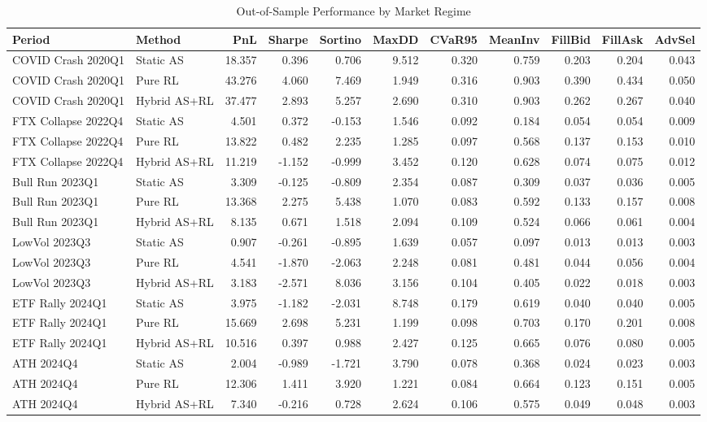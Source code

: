 \begin{table}[htbp]
\centering
\caption{Out-of-Sample Performance by Market Regime}
\label{tab:by_period}
\small
\begin{adjustbox}{max width=\textwidth}
\begin{tabular}{llrrrrrrrrr}
\toprule
Period & Method & PnL & Sharpe & Sortino & MaxDD & CVaR95 & MeanInv & FillBid & FillAsk & AdvSel \\
\midrule
COVID Crash 2020Q1 & Static AS & 18.357 & 0.396 & 0.706 & 9.512 & 0.320 & 0.759 & 0.203 & 0.204 & 0.043 \\
COVID Crash 2020Q1 & Pure RL & 43.276 & 4.060 & 7.469 & 1.949 & 0.316 & 0.903 & 0.390 & 0.434 & 0.050 \\
COVID Crash 2020Q1 & Hybrid AS+RL & 37.477 & 2.893 & 5.257 & 2.690 & 0.310 & 0.903 & 0.262 & 0.267 & 0.040 \\
FTX Collapse 2022Q4 & Static AS & 4.501 & 0.372 & -0.153 & 1.546 & 0.092 & 0.184 & 0.054 & 0.054 & 0.009 \\
FTX Collapse 2022Q4 & Pure RL & 13.822 & 0.482 & 2.235 & 1.285 & 0.097 & 0.568 & 0.137 & 0.153 & 0.010 \\
FTX Collapse 2022Q4 & Hybrid AS+RL & 11.219 & -1.152 & -0.999 & 3.452 & 0.120 & 0.628 & 0.074 & 0.075 & 0.012 \\
Bull Run 2023Q1 & Static AS & 3.309 & -0.125 & -0.809 & 2.354 & 0.087 & 0.309 & 0.037 & 0.036 & 0.005 \\
Bull Run 2023Q1 & Pure RL & 13.368 & 2.275 & 5.438 & 1.070 & 0.083 & 0.592 & 0.133 & 0.157 & 0.008 \\
Bull Run 2023Q1 & Hybrid AS+RL & 8.135 & 0.671 & 1.518 & 2.094 & 0.109 & 0.524 & 0.066 & 0.061 & 0.004 \\
LowVol 2023Q3 & Static AS & 0.907 & -0.261 & -0.895 & 1.639 & 0.057 & 0.097 & 0.013 & 0.013 & 0.003 \\
LowVol 2023Q3 & Pure RL & 4.541 & -1.870 & -2.063 & 2.248 & 0.081 & 0.481 & 0.044 & 0.056 & 0.004 \\
LowVol 2023Q3 & Hybrid AS+RL & 3.183 & -2.571 & 8.036 & 3.156 & 0.104 & 0.405 & 0.022 & 0.018 & 0.003 \\
ETF Rally 2024Q1 & Static AS & 3.975 & -1.182 & -2.031 & 8.748 & 0.179 & 0.619 & 0.040 & 0.040 & 0.005 \\
ETF Rally 2024Q1 & Pure RL & 15.669 & 2.698 & 5.231 & 1.199 & 0.098 & 0.703 & 0.170 & 0.201 & 0.008 \\
ETF Rally 2024Q1 & Hybrid AS+RL & 10.516 & 0.397 & 0.988 & 2.427 & 0.125 & 0.665 & 0.076 & 0.080 & 0.005 \\
ATH 2024Q4 & Static AS & 2.004 & -0.989 & -1.721 & 3.790 & 0.078 & 0.368 & 0.024 & 0.023 & 0.003 \\
ATH 2024Q4 & Pure RL & 12.306 & 1.411 & 3.920 & 1.221 & 0.084 & 0.664 & 0.123 & 0.151 & 0.005 \\
ATH 2024Q4 & Hybrid AS+RL & 7.340 & -0.216 & 0.728 & 2.624 & 0.106 & 0.575 & 0.049 & 0.048 & 0.003 \\
\bottomrule
\end{tabular}
\end{adjustbox}
\end{table}
